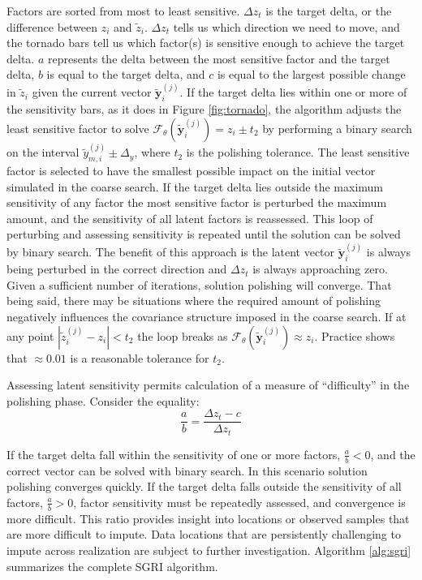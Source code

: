 Factors are sorted from most to least sensitive. $\Delta z_{t}$ is the target delta, or the difference between $z_{i}$ and $\tilde{z}_{i}$. $\Delta z_{t}$ tells us which direction we need to move, and the tornado bars tell us which factor(s) is sensitive enough to achieve the target delta. $a$ represents the delta between the most sensitive factor and the target delta, $b$ is equal to the target delta, and $c$ is equal to the largest possible change in $\tilde{z}_{i}$ given the current vector $\tilde{\mathbf{y}}_{i}^{(j)}$. If the target delta lies within one or more of the sensitivity bars, as it does in Figure \ref{fig:tornado}, the algorithm adjusts the least sensitive factor to solve $\mathcal{F}_{\theta}(\tilde{\mathbf{y}}_{i}^{(j)}) = z_{i} \pm t_{2}$ by performing a binary search \citep{nowak2008generalized} on the interval $\tilde{y}_{m, i}^{(j)} \pm \Delta_{y}$, where $t_{2}$ is the polishing tolerance. The least sensitive factor is selected to have the smallest possible impact on the initial vector simulated in the coarse search. If the target delta lies outside the maximum sensitivity of any factor the most sensitive factor is perturbed the maximum amount, and the sensitivity of all latent factors is reassessed. This loop of perturbing and assessing sensitivity is repeated until the solution can be solved by binary search. The benefit of this approach is the latent vector $\tilde{\mathbf{y}}_{i}^{(j)}$ is always being perturbed in the correct direction and $\Delta z_{t}$ is always approaching zero. Given a sufficient number of iterations, solution polishing will converge. That being said, there may be situations where the required amount of polishing negatively influences the covariance structure imposed in the coarse search. If at any point $|\tilde{z}_{i}^{(j)} - z_{i}| < t_{2}$ the loop breaks as $\mathcal{F}_{\theta}(\tilde{\mathbf{y}}_{i}^{(j)}) \approx z_{i}$. Practice shows that $\approx 0.01$ is a reasonable tolerance for $t_2$.

Assessing latent sensitivity permits calculation of a measure of ``difficulty'' in the polishing phase. Consider the equality:
\begin{equation}
    \frac{a}{b} = \frac{\Delta z_{t} - c}{\Delta z_{t}}
    \label{eq:aoverb}
\end{equation}

If the target delta fall within the sensitivity of one or more factors, $\frac{a}{b}<0$, and the correct vector can be solved with binary search. In this scenario solution polishing converges quickly. If the target delta falls outside the sensitivity of all factors, $\frac{a}{b}>0$, factor sensitivity must be repeatedly assessed, and convergence is more difficult. This ratio provides insight into locations or observed samples that are more difficult to impute. Data locations that are persistently challenging to impute across realization are subject to further investigation. Algorithm \ref{alg:sgri} summarizes the complete \gls{SGRI} algorithm.

